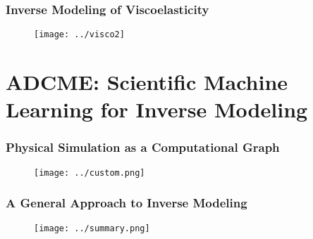 \documentclass[usenames,dvipsnames]{beamer}
\begin{document}
\begin{frame}
	\frametitle{Inverse Modeling of Viscoelasticity}
	\begin{figure}[hbt]
  \texttt{[image: ../visco2]}
\end{figure}

\end{frame}


\section{ADCME: Scientific Machine Learning for Inverse Modeling}

\begin{frame}
	\frametitle{Physical Simulation as a Computational Graph}
	\begin{figure}[hbt]
		\texttt{[image: ../custom.png]}
	\end{figure}
\end{frame}

\begin{frame}
	\frametitle{A General Approach to Inverse Modeling}
	\begin{figure}[hbt]
  \texttt{[image: ../summary.png]}
\end{figure}
%
\end{frame}


\end{document}
